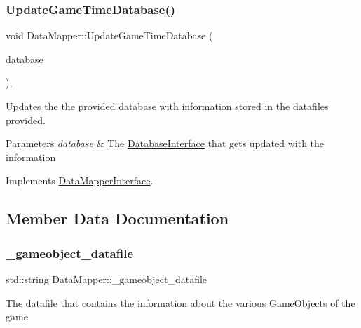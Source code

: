 \subsubsection{\texorpdfstring{Update\+Game\+Time\+Database()}{UpdateGameTimeDatabase()}}
{\footnotesize\ttfamily void Data\+Mapper\+::\+Update\+Game\+Time\+Database (\begin{DoxyParamCaption}\item[{std\+::shared\+\_\+ptr$<$ \hyperlink{class_database_interface}{Database\+Interface} $>$}]{database }\end{DoxyParamCaption})\hspace{0.3cm}{\ttfamily [override]}, {\ttfamily [virtual]}}



Updates the the provided database with information stored in the datafiles provided. 


\begin{DoxyParams}{Parameters}
{\em database} & The \hyperlink{class_database_interface}{Database\+Interface} that gets updated with the information \\
\hline
\end{DoxyParams}


Implements \hyperlink{class_data_mapper_interface_a4a16cab058079e14c1e6169d8038696f}{Data\+Mapper\+Interface}.



\subsection{Member Data Documentation}
\mbox{\label{class_data_mapper_a7906ac7e6e95631428095246fcdefecb}} 
\subsubsection{\texorpdfstring{\+\_\+gameobject\+\_\+datafile}{\_gameobject\_datafile}}
{\footnotesize\ttfamily std\+::string Data\+Mapper\+::\+\_\+gameobject\+\_\+datafile\hspace{0.3cm}{\ttfamily [private]}}

The datafile that contains the information about the various Game\+Objects of the game \mbox{\label{class_data_mapper_ad64f65ef0ca4a3ed5e0ded4318ee3357}} 
